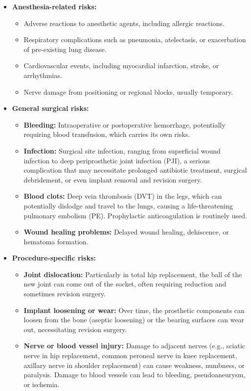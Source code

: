 \begin{itemize}
  \item \textbf{Anesthesia-related risks:}
    \begin{itemize}
      \item Adverse reactions to anesthetic agents, including allergic reactions.
      \item Respiratory complications such as pneumonia, atelectasis, or exacerbation of pre-existing lung disease.
      \item Cardiovascular events, including myocardial infarction, stroke, or arrhythmias.
      \item Nerve damage from positioning or regional blocks, usually temporary.
    \end{itemize}
  \item \textbf{General surgical risks:}
    \begin{itemize}
      \item \textbf{Bleeding:} Intraoperative or postoperative hemorrhage, potentially requiring blood transfusion, which carries its own risks.
      \item \textbf{Infection:} Surgical site infection, ranging from superficial wound infection to deep periprosthetic joint infection (PJI), a serious complication that may necessitate prolonged antibiotic treatment, surgical debridement, or even implant removal and revision surgery.
      \item \textbf{Blood clots:} Deep vein thrombosis (DVT) in the legs, which can potentially dislodge and travel to the lungs, causing a life-threatening pulmonary embolism (PE). Prophylactic anticoagulation is routinely used.
      \item \textbf{Wound healing problems:} Delayed wound healing, dehiscence, or hematoma formation.
    \end{itemize}
  \item \textbf{Procedure-specific risks:}
    \begin{itemize}
      \item \textbf{Joint dislocation:} Particularly in total hip replacement, the ball of the new joint can come out of the socket, often requiring reduction and sometimes revision surgery.
      \item \textbf{Implant loosening or wear:} Over time, the prosthetic components can loosen from the bone (aseptic loosening) or the bearing surfaces can wear out, necessitating revision surgery.
      \item \textbf{Nerve or blood vessel injury:} Damage to adjacent nerves (e.g., sciatic nerve in hip replacement, common peroneal nerve in knee replacement, axillary nerve in shoulder replacement) can cause weakness, numbness, or paralysis. Damage to blood vessels can lead to bleeding, pseudoaneurysm, or ischemia.

\end{itemize}
\end{itemize}
